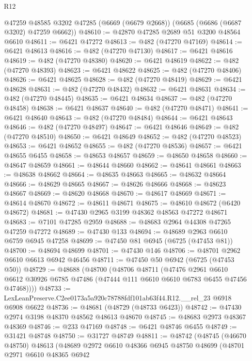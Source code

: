 \begin{lexlean}{R12}
\begin{coremodule}
    @47259
    @48585
    @3202
    @47285
    (@6669 (@6679 @2668))
    (@6685 (@6686 (@6687 @3202) @47259 @6662))
@48610 := @42870 @47285 @2689 @51 @3200 @48564 @6610
@48611 := @6421 @47272
@48613 := @482 (@47270 @47169)
@48614 := @6421 @48613
@48616 := @482 (@47270 @47130)
@48617 := @6421 @48616
@48619 := @482 (@47270 @48380)
@48620 := @6421 @48619
@48622 := @482 (@47270 @48393)
@48623 := @6421 @48622
@48625 := @482 (@47270 @48406)
@48626 := @6421 @48625
@48628 := @482 (@47270 @48419)
@48629 := @6421 @48628
@48631 := @482 (@47270 @48432)
@48632 := @6421 @48631
@48634 := @482 (@47270 @48445)
@48635 := @6421 @48634
@48637 := @482 (@47270 @48458)
@48638 := @6421 @48637
@48640 := @482 (@47270 @48471)
@48641 := @6421 @48640
@48643 := @482 (@47270 @48484)
@48644 := @6421 @48643
@48646 := @482 (@47270 @48497)
@48647 := @6421 @48646
@48649 := @482 (@47270 @48510)
@48650 := @6421 @48649
@48652 := @482 (@47270 @48523)
@48653 := @6421 @48652
@48655 := @482 (@47270 @48536)
@48657 := @6421 @48655 @6455
@48658 := @48653 @48657
@48659 := @48650 @48658
@48660 := @48647 @48659
@48661 := @48644 @48660
@48662 := @48641 @48661
@48663 := @48638 @48662
@48664 := @48635 @48663
@48665 := @48632 @48664
@48666 := @48629 @48665
@48667 := @48626 @48666
@48668 := @48623 @48667
@48669 := @48620 @48668
@48670 := @48617 @48669
@48671 := @48614 @48670
@48672 := @48611 @48671
@48675 := @48610 @48672 (@6420 @48672)
@48681 := @47430 @2965 @3199 @48362 @48563 @47272 @48671
@48683 := @7101 @47285 @2959
@48688 := @48683 @2964 @44308 @47265 @47259 @47272
@48689 := @47430 @133
@48694 := @48689 @2963 @6610 @6759 @6945 @47258
@48699 := @47450 @81 @6945 (@6725 (@47453 @81))
@48700 := @48694 @48699
@48701 := @47430 @146
@48706 := @48701 @2962 @6610 @6613 @6942 @46456
@48711 := @47450 @50 @6942 (@6725 (@47453 @50))
@48729 := @48688
    (@48700
      (@48706
        @48711
        (@47476
          @2961
          @6610
          @6612
          @30926
          @6785
          @47486
          (@47444 @111 @6610 @6610 @6783 @6455 @47456 @47468))))
@48733 := LexLeanPreserve.C2ee0173a5a920c78788fdf101ab63f44.R12.__rel_23 @6918 @6908 @6622
@48736 := @48681 (@48729 (@48733 @6423))
@48742 := @47430 @2974 @3198 @48370 @48562 @48613 @48670
@48745 := @48683 @2973 @48367 @48369
@48746 := @233 @47169
@48748 := @6421 @48746 @6455
@48749 := @31421 @48748
@48750 := @31727 @48749
@48811 := @48742
    (@48745
      (@46670 @48750)
      @48613
      (@48689
        @2972
        @6610
        @48366
        @6945
        @48750
        @48699
        (@48701
          @2971
          @6610
          @48365
          @6942

\end{coremodule}
\end{lexlean}
